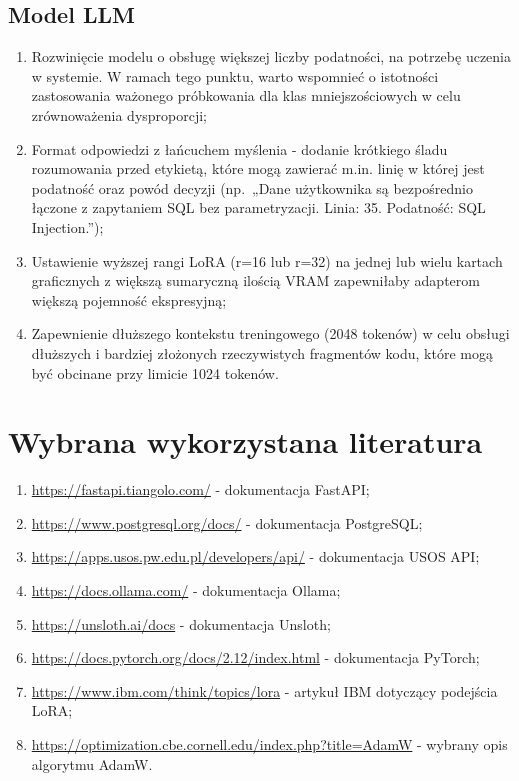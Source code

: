 \documentclass[12pt,a4paper]{article}
\begin{document}
\subsection{Model LLM}
\begin{enumerate}
    \item Rozwinięcie modelu o obsługę większej liczby podatności, na potrzebę uczenia w systemie. W ramach tego punktu, warto wspomnieć o istotności zastosowania ważonego próbkowania dla klas mniejszościowych w celu zrównoważenia dysproporcji;
    \item Format odpowiedzi z łańcuchem myślenia - dodanie krótkiego śladu rozumowania przed etykietą, które mogą zawierać m.in. linię w której jest podatność oraz powód decyzji (np.\ „Dane użytkownika są bezpośrednio łączone z zapytaniem SQL bez parametryzacji. Linia: 35. Podatność: SQL Injection.'');
    \item Ustawienie wyższej rangi LoRA (r=16 lub r=32) na jednej lub wielu kartach graficznych z większą sumaryczną ilością VRAM zapewniłaby adapterom większą pojemność ekspresyjną;
    \item Zapewnienie dłuższego kontekstu treningowego (2048 tokenów) w celu obsługi dłuższych i bardziej złożonych rzeczywistych fragmentów kodu, które mogą być obcinane przy limicie 1024 tokenów.
\end{enumerate}



\section{Wybrana wykorzystana literatura}
\begin{enumerate}
    \item \url{https://fastapi.tiangolo.com/} - dokumentacja FastAPI;
    \item \url{https://www.postgresql.org/docs/} - dokumentacja PostgreSQL;
    \item \url{https://apps.usos.pw.edu.pl/developers/api/} - dokumentacja USOS API;
    \item \url{https://docs.ollama.com/} - dokumentacja Ollama;
    \item \url{https://unsloth.ai/docs} - dokumentacja Unsloth;
    \item \url{https://docs.pytorch.org/docs/2.12/index.html} - dokumentacja PyTorch;
    \item \url{https://www.ibm.com/think/topics/lora} - artykuł IBM dotyczący podejścia LoRA;
    \item \url{https://optimization.cbe.cornell.edu/index.php?title=AdamW} - wybrany opis algorytmu AdamW.
\end{enumerate}
\end{document}
